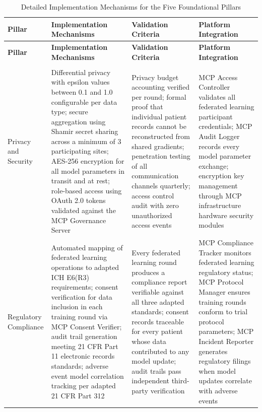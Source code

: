 \begin{longtable}{>{\raggedright\arraybackslash}p{2cm} >{\raggedright\arraybackslash}p{4.25cm} >{\raggedright\arraybackslash}p{4.25cm} >{\raggedright\arraybackslash}p{4.25cm}}\caption{Detailed Implementation Mechanisms for the Five Foundational Pillars}
\label{tab:fl-pillar-details} \\
\toprule
\textbf{Pillar} & \textbf{Implementation Mechanisms} & \textbf{Validation Criteria} & \textbf{Platform Integration} \\
\midrule
\endfirsthead
\toprule
\textbf{Pillar} & \textbf{Implementation Mechanisms} & \textbf{Validation Criteria} & \textbf{Platform Integration} \\
\midrule
\endhead
\midrule
\multicolumn{4}{r}{\textit{Continued on next page}} \\
\bottomrule
\endfoot
\bottomrule
\endlastfoot
Privacy and Security & Differential privacy with epsilon values between 0.1 and 1.0 configurable per data type; secure aggregation using Shamir secret sharing across a minimum of 3 participating sites; AES-256 encryption for all model parameters in transit and at rest; role-based access using OAuth 2.0 tokens validated against the MCP Governance Server & Privacy budget accounting verified per round; formal proof that individual patient records cannot be reconstructed from shared gradients; penetration testing of all communication channels quarterly; access control audit with zero unauthorized access events & MCP Access Controller validates all federated learning participant credentials; MCP Audit Logger records every model parameter exchange; encryption key management through MCP infrastructure hardware security modules \\
\midrule
Regulatory Compliance & Automated mapping of federated learning operations to adapted ICH E6(R3) \cite{ich-adapt} requirements; consent verification for data inclusion in each training round via MCP Consent Verifier; audit trail generation meeting 21 CFR Part 11 electronic records standards; adverse event model correlation tracking per adapted 21 CFR Part 312 \cite{cfr312-adapt} & Every federated learning round produces a compliance report verifiable against all three adapted standards; consent records traceable for every patient whose data contributed to any model update; audit trails pass independent third-party verification & MCP Compliance Tracker monitors federated learning regulatory status; MCP Protocol Manager ensures training rounds conform to trial protocol parameters; MCP Incident Reporter generates regulatory filings when model updates correlate with adverse events \\

\end{longtable}
